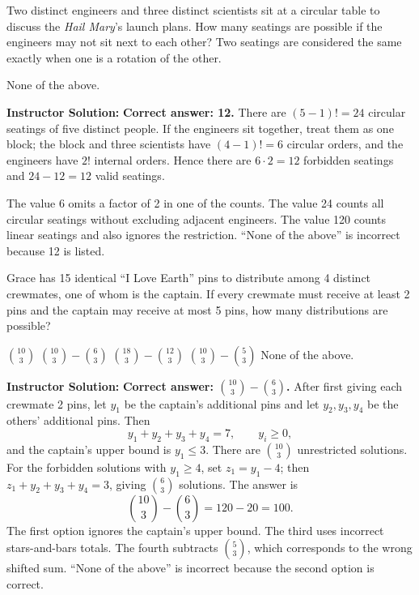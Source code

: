 \documentclass[11pt,addpoints]{exam}
\renewenvironment{solution}
{\par\medskip\noindent\hrulefill\par\smallskip\noindent\textbf{Instructor Solution:}\enspace\ignorespaces}
{\par\smallskip\noindent\hrulefill\par\medskip}
\begin{document}
\begin{questions}
\question[5] Two distinct engineers and three distinct scientists sit at a circular table to discuss the \textit{Hail Mary}'s launch plans. How many seatings are possible if the engineers may not sit next to each other? Two seatings are considered the same exactly when one is a rotation of the other.
\begin{choices}
    \choice None of the above.
\end{choices}
\begin{solution}
\textbf{Correct answer: 12.} There are $(5-1)!=24$ circular seatings of five distinct people. If the engineers sit together, treat them as one block; the block and three scientists have $(4-1)!=6$ circular orders, and the engineers have $2!$ internal orders. Hence there are $6\cdot2=12$ forbidden seatings and $24-12=12$ valid seatings.

The value 6 omits a factor of 2 in one of the counts. The value 24 counts all circular seatings without excluding adjacent engineers. The value 120 counts linear seatings and also ignores the restriction. ``None of the above'' is incorrect because 12 is listed.
\end{solution}

\question[5] Grace has 15 identical ``I Love Earth'' pins to distribute among 4 distinct crewmates, one of whom is the captain. If every crewmate must receive at least 2 pins and the captain may receive at most 5 pins, how many distributions are possible?
\begin{choices}
    \choice $\binom{10}{3}$
    \CorrectChoice $\binom{10}{3}-\binom{6}{3}$
    \choice $\binom{18}{3}-\binom{12}{3}$
    \choice $\binom{10}{3}-\binom{5}{3}$
    \choice None of the above.
\end{choices}
\begin{solution}
\textbf{Correct answer: $\binom{10}{3}-\binom{6}{3}$.} After first giving each crewmate 2 pins, let $y_1$ be the captain's additional pins and let $y_2,y_3,y_4$ be the others' additional pins. Then
\[
y_1+y_2+y_3+y_4=7,\qquad y_i\ge0,
\]
and the captain's upper bound is $y_1\le3$. There are $\binom{10}{3}$ unrestricted solutions. For the forbidden solutions with $y_1\ge4$, set $z_1=y_1-4$; then $z_1+y_2+y_3+y_4=3$, giving $\binom{6}{3}$ solutions. The answer is
\[
\binom{10}{3}-\binom{6}{3}=120-20=100.
\]
The first option ignores the captain's upper bound. The third uses incorrect stars-and-bars totals. The fourth subtracts $\binom53$, which corresponds to the wrong shifted sum. ``None of the above'' is incorrect because the second option is correct.
\end{solution}


\end{questions}
\end{document}

